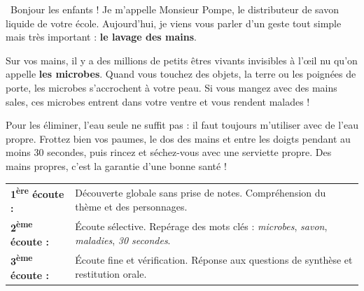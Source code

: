 \documentclass[a4paper,10pt]{article}
\begin{document}
\vspace{3pt}

\begin{tcolorbox}[
  enhanced,
  colback=white,
  colframe=primary!70,
  arc=2mm,boxrule=0.8pt,
  top=5pt,bottom=5pt,left=8pt,right=8pt,
  title={\small\textbf{\textcolor{primary}{\faVolumeUp\ Texte du support d'écoute : \guillemotleft\ Le lavage des mains selon M. Pompe \guillemotright}}},
  coltitle=primary,colbacktitle=primarylight,
  titlerule=0.5pt,titlerule style=primary!40
]
{\small
\guillemotleft\ Bonjour les enfants ! Je m'appelle Monsieur Pompe, le distributeur de savon liquide de votre école. Aujourd'hui, je viens vous parler d'un geste tout simple mais très important : \textbf{le lavage des mains}.

Sur vos mains, il y a des millions de petits êtres vivants invisibles à l'\oe il nu qu'on appelle \textbf{les microbes}. Quand vous touchez des objets, la terre ou les poignées de porte, les microbes s'accrochent à votre peau. Si vous mangez avec des mains sales, ces microbes entrent dans votre ventre et vous rendent malades !

Pour les éliminer, l'eau seule ne suffit pas : il faut toujours m'utiliser avec de l'eau propre. Frottez bien vos paumes, le dos des mains et entre les doigts pendant au moins 30 secondes, puis rincez et séchez-vous avec une serviette propre. Des mains propres, c'est la garantie d'une bonne santé ! \guillemotright
}
\end{tcolorbox}

\vspace{3pt}

\begin{tcolorbox}[
  enhanced,
  colback=neutrallight,
  colframe=cardborder,
  arc=1.5mm,boxrule=0.6pt,
  top=4pt,bottom=4pt,left=7pt,right=7pt,
  title={\small\textbf{\textcolor{primary}{\faChalkboardTeacher\ Démarche des 3 écoutes méthodiques}}},
  coltitle=primary,colbacktitle=white,titlerule=0.4pt
]
{\footnotesize
\begin{tabularx}{\linewidth}{l X}
\textbf{1\textsuperscript{ère} écoute :} & Découverte globale sans prise de notes. Compréhension du thème et des personnages.\\
\textbf{2\textsuperscript{ème} écoute :} & Écoute sélective. Repérage des mots clés : \textit{microbes}, \textit{savon}, \textit{maladies}, \textit{30 secondes}.\\
\textbf{3\textsuperscript{ème} écoute :} & Écoute fine et vérification. Réponse aux questions de synthèse et restitution orale.\\
\end{tabularx}
}
\end{tcolorbox}
\end{document}

